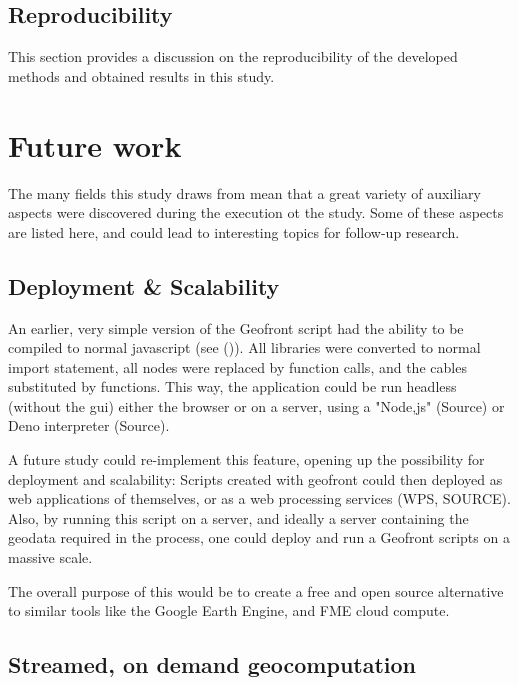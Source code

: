 \subsection*{Reproducibility}
This section provides a discussion on the reproducibility of the developed methods and obtained results in this study.



\section{Future work}
\label{sec:future-work}
The many fields this study draws from mean that a great variety of auxiliary aspects were discovered during the execution ot the study. 
Some of these aspects are listed here, and could lead to interesting topics for follow-up research. 

\subsection{Deployment \& Scalability}
An earlier, very simple version of the Geofront script had the ability to be compiled to normal javascript (see ()).  
All libraries were converted to normal import statement, all nodes were replaced by function calls, and the cables substituted by functions. 
This way, the application could be run headless (without the \ac{gui}) either the browser or on a server, using a "Node,js" (Source) or Deno interpreter (Source).

A future study could re-implement this feature, opening up the possibility for deployment and scalability: 
Scripts created with geofront could then deployed as web applications of themselves, or as a web processing services (WPS, SOURCE).
Also, by running this script on a server, and ideally a server containing the geodata required in the process, one could deploy and run a Geofront scripts on a massive scale. 

The overall purpose of this would be to create a free and open source alternative to similar tools like the Google Earth Engine, and FME cloud compute. 

\subsection{Streamed, on demand geocomputation}

